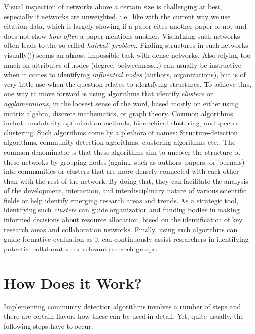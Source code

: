 \documentclass[
  letterpaper,
]{scrreprt}
\begin{document}
Visual inspection of networks above a certain size is challenging at
best, especially if networks are unweighted, i.e.~like with the current
way we use citation data, which is largely showing if a paper cites
another paper or not and does not show \emph{how often} a paper mentions
another. Visualizing such networks often leads to the so-called
\emph{hairball problem}. Finding structures in such networks visually(!)
seems an almost impossible task with dense networks. Also relying too
much on attributes of nodes (degree, betweenness\ldots) can usually be
instructive when it comes to identifying \emph{influential nodes}
(authors, organizations), but is of very little use when the question
relates to identifying structures. To achieve this, one way to move
forward is using algorithms that identify \emph{clusters} or
\emph{agglomerations}, in the loosest sense of the word, based mostly on
either using matrix algebra, discrete mathematics, or graph theory.
Common algorithms include modularity optimization methods, hierarchical
clustering, and spectral clustering. Such algorithms come by a plethora
of names: Structure-detection algorithms, community-detection
algorithms, clustering algorithms etc\ldots{} The common denominator is
that these algorithms aim to uncover the structure of these networks by
grouping nodes (again\ldots{} such as authors, papers, or journals) into
communities or clusters that are more densely connected with each other
than with the rest of the network. By doing that, they can facilitate
the analysis of the development, interaction, and interdisciplinary
nature of various scientific fields or help identify emerging research
areas and trends. As a strategic tool, identifying such \emph{clusters}
can guide organization and funding bodies in making informed decisions
about resource allocation, based on the identification of key research
areas and collaboration networks. Finally, using such algorithms can
guide formative evaluation as it can continuously assist researchers in
identifying potential collaborators or relevant research groups.

\section{How Does it Work?}\label{how-does-it-work-9}

Implementing community detection algorithms involves a number of steps
and there are certain flavors how these can be used in detail. Yet,
quite usually, the following steps have to occur.
\end{document}
